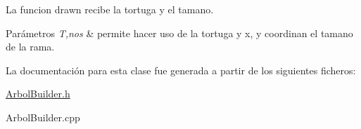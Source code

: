 La funcion drawn recibe la tortuga y el tamano. 
\begin{DoxyParams}{Parámetros}
{\em T,nos} & permite hacer uso de la tortuga y x, y coordinan el tamano de la rama. \\
\hline
\end{DoxyParams}


La documentación para esta clase fue generada a partir de los siguientes ficheros\+:\begin{DoxyCompactItemize}
\item 
\hyperlink{ArbolBuilder_8h}{Arbol\+Builder.\+h}\item 
Arbol\+Builder.\+cpp\end{DoxyCompactItemize}
